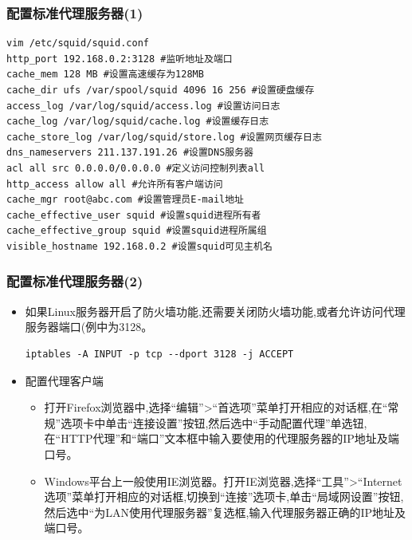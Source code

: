 \documentclass[xcolor=svgnames,presentation]{beamer}
\begin{document}
\begin{frame}[fragile]
\frametitle{配置标准代理服务器(1)}
\label{sec-4-8}


\begin{verbatim}
vim /etc/squid/squid.conf
http_port 192.168.0.2:3128 #监听地址及端口
cache_mem 128 MB #设置高速缓存为128MB
cache_dir ufs /var/spool/squid 4096 16 256 #设置硬盘缓存
access_log /var/log/squid/access.log #设置访问日志
cache_log /var/log/squid/cache.log #设置缓存日志
cache_store_log /var/log/squid/store.log #设置网页缓存日志
dns_nameservers 211.137.191.26 #设置DNS服务器
acl all src 0.0.0.0/0.0.0.0 #定义访问控制列表all
http_access allow all #允许所有客户端访问
cache_mgr root@abc.com #设置管理员E-mail地址
cache_effective_user squid #设置squid进程所有者
cache_effective_group squid #设置squid进程所属组
visible_hostname 192.168.0.2 #设置squid可见主机名
\end{verbatim}
\end{frame}
\begin{frame}[fragile]
\frametitle{配置标准代理服务器(2)}
\label{sec-4-9}
\begin{itemize}

\item 如果Linux服务器开启了防火墙功能,还需要关闭防火墙功能,或者允许访问代理服务器端口(例中为3128。\\
\label{sec-4-9-1}%
\begin{verbatim}
iptables -A INPUT -p tcp --dport 3128 -j ACCEPT
\end{verbatim}

\item 配置代理客户端
\label{sec-4-9-2}%
\begin{itemize}

\item 打开Firefox浏览器中,选择“编辑”>“首选项”菜单打开相应的对话框,在“常规”选项卡中单击“连接设置”按钮,然后选中“手动配置代理”单选钮,在“HTTP代理”和“端口”文本框中输入要使用的代理服务器的IP地址及端口号。
\label{sec-4-9-2-1}%

\item Windows平台上一般使用IE浏览器。打开IE浏览器,选择“工具”>“Internet选项”菜单打开相应的对话框,切换到“连接”选项卡,单击“局域网设置”按钮,然后选中“为LAN使用代理服务器”复选框,输入代理服务器正确的IP地址及端口号。
\label{sec-4-9-2-2}%
\end{itemize} %
\end{itemize} %
\end{frame}
\end{document}

